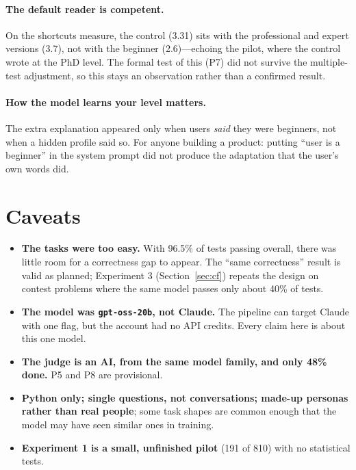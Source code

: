 \documentclass[11pt,a4paper]{article}
\newcommand{\code}[1]{\texttt{#1}}
\begin{document}
\paragraph{The default reader is competent.} On the shortcuts measure, the control (3.31) sits with the professional and expert versions (3.7), not with the beginner (2.6)---echoing the pilot, where the control wrote at the PhD level. The formal test of this (P7) did not survive the multiple-test adjustment, so this stays an observation rather than a confirmed result.

\paragraph{How the model learns your level matters.} The extra explanation appeared only when users \emph{said} they were beginners, not when a hidden profile said so. For anyone building a product: putting ``user is a beginner'' in the system prompt did not produce the adaptation that the user's own words did.

\section{Caveats}\label{sec:limits}
\begin{itemize}
\item \textbf{The tasks were too easy.} With 96.5\% of tests passing overall, there was little room for a correctness gap to appear. The ``same correctness'' result is valid as planned; Experiment 3 (Section~\ref{sec:cf}) repeats the design on contest problems where the same model passes only about 40\% of tests.
\item \textbf{The model was \code{gpt-oss-20b}, not Claude.} The pipeline can target Claude with one flag, but the account had no API credits. Every claim here is about this one model.
\item \textbf{The judge is an AI, from the same model family, and only 48\% done.} P5 and P8 are provisional.
\item \textbf{Python only; single questions, not conversations; made-up personas rather than real people}; some task shapes are common enough that the model may have seen similar ones in training.
\item \textbf{Experiment 1 is a small, unfinished pilot} (191 of 810) with no statistical tests.
\end{itemize}
\end{document}
